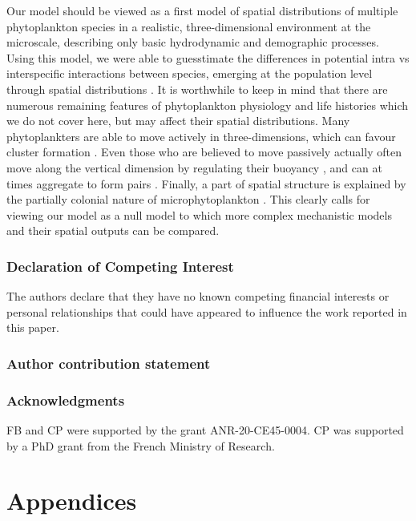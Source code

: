 \documentclass[english]{article}
\begin{document}
Our model should be viewed as a first model of spatial distributions
of multiple phytoplankton species in a realistic, three-dimensional
environment at the microscale, describing only basic hydrodynamic
and demographic processes. Using this model, we were able to guesstimate
the differences in potential intra vs interspecific interactions between
species, emerging at the population level through spatial distributions
\citep{detto_stabilization_2016}. It is worthwhile to keep in mind
that there are numerous remaining features of phytoplankton physiology
and life histories which we do not cover here, but may affect their
spatial distributions. Many phytoplankters are able to move actively
in three-dimensions, which can favour cluster formation \citep{breier_emergence_2018}.
Even those who are believed to move passively actually often move
along the vertical dimension by regulating their buoyancy \citep{reynolds2006ecology},
and can at times aggregate to form pairs \citep{font-munoz_collective_2019}. Finally, a
part of spatial structure is explained by the partially colonial nature
of microphytoplankton \citep{kiorboe_coagulation_1990}. This clearly
calls for viewing our model as a null model to which more complex
mechanistic models and their spatial outputs can be compared.

\subsubsection*{Declaration of Competing Interest}

The authors declare that they have no known competing financial interests
or personal relationships that could have appeared to influence the
work reported in this paper.

\subsubsection*{Author contribution statement}

\subsubsection*{Acknowledgments}

FB and CP were supported by the grant ANR-20-CE45-0004. CP was supported
by a PhD grant from the French Ministry of Research.

\section*{Appendices}
\end{document}
